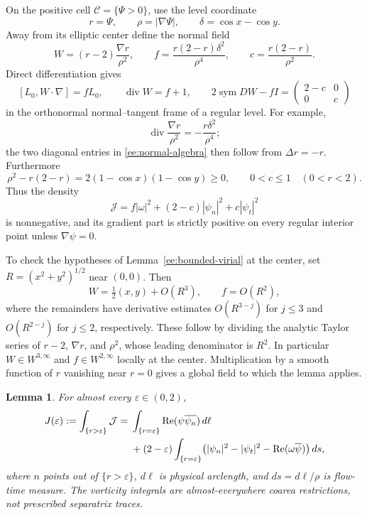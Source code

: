 \documentclass[reqno,11pt]{amsart}
\numberwithin{equation}{section}
\newtheorem{lemma}[theorem]{Lemma}
\theoremstyle{remark}
\begin{document}
On the positive cell $\mathcal C=\{\Psi>0\}$, use the level coordinate
\[
 r=\Psi,\qquad \rho=|\nabla\Psi|,
 \qquad \delta=\cos x-\cos y.
\]
Away from its elliptic center define the normal field
\begin{equation}\label{ee:normal-field}
 W=(r-2)\frac{\nabla r}{\rho^2},\qquad
 f=\frac{r(2-r)\delta^2}{\rho^4},\qquad
 c=\frac{r(2-r)}{\rho^2}.
\end{equation}
Direct differentiation gives
\begin{equation}\label{ee:normal-algebra}
 [L_0,W\cdot\nabla]=fL_0,\qquad
 \operatorname{div}W=f+1,\qquad
 2\operatorname{sym}DW-fI=\begin{pmatrix}2-c&0\\0&c\end{pmatrix}
\end{equation}
in the orthonormal normal--tangent frame of a regular level.
For example,
\[
 \operatorname{div}\frac{\nabla r}{\rho^2}
   =-\frac{r\delta^2}{\rho^4};
\]
the two diagonal entries in \eqref{ee:normal-algebra} then follow
from $\Delta r=-r$. Furthermore
\begin{equation}\label{ee:c-positive}
 \rho^2-r(2-r)=2(1-\cos x)(1-\cos y)\ge0,
 \qquad 0<c\le1\quad(0<r<2).
\end{equation}
Thus the density
\begin{equation}\label{ee:positive-density}
 \mathcal J=f|\omega|^2+(2-c)|\psi_n|^2+c|\psi_t|^2
\end{equation}
is nonnegative, and its gradient part is strictly positive on every
regular interior point unless $\nabla\psi=0$.

To check the hypotheses of Lemma~\ref{ee:bounded-virial} at the center, set
$R=(x^2+y^2)^{1/2}$ near $(0,0)$. Then
\[
 W=\tfrac12(x,y)+O(R^3),\qquad f=O(R^2),
\]
where the remainders have derivative estimates
$O(R^{3-j})$ for $j\le3$ and $O(R^{2-j})$ for $j\le2$,
respectively. These follow by dividing the analytic Taylor series
of $r-2$, $\nabla r$, and $\rho^2$, whose leading denominator is
$R^2$. In particular $W\in W^{3,\infty}$ and
$f\in W^{2,\infty}$ locally at the center. Multiplication by a
smooth function of $r$ vanishing near $r=0$ gives a global field to
which the lemma applies.

\begin{lemma}\label{ee:truncated-virial}
For almost every $\varepsilon\in(0,2)$,
\begin{align}\label{ee:boundary-identity}
 J(\varepsilon):=\int_{\{r>\varepsilon\}}\mathcal J
 ={}&\int_{\{r=\varepsilon\}}
                \operatorname{Re}(\psi\overline{\psi_n})\,d\ell\\
 &+(2-\varepsilon)\int_{\{r=\varepsilon\}}
       \bigl(|\psi_n|^2-|\psi_t|^2
                      -\operatorname{Re}(\omega\overline\psi)\bigr)\,ds,
 \notag
\end{align}
where $n$ points out of $\{r>\varepsilon\}$,
$d\ell$ is physical arclength, and $ds=d\ell/\rho$ is flow-time
measure. The vorticity integrals are almost-everywhere coarea
restrictions, not prescribed separatrix traces.
\end{lemma}
\end{document}
